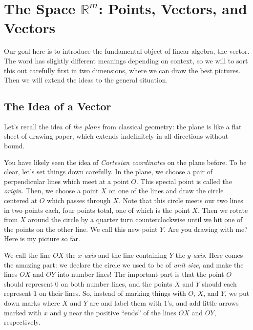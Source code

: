 \documentclass[elementsmain.tex]{subfiles}
\begin{document}
\section{The Space $\mathbb{R}^m$: Points, Vectors, and Vectors}


Our goal here is to introduce the fundamental object of linear algebra, the vector. The word has slightly different meanings depending on context, so we will to sort this out carefully first in two dimensions, where we can draw the best pictures. Then we will extend the ideas to the general situation.

\subsection*{The Idea of a Vector}

Let's recall the idea of \emph{the plane} from classical geometry: the plane is like a flat sheet of drawing paper, which extends indefinitely in all directions without bound.


You have likely seen the idea of \emph{Cartesian coordinates} on the plane before. To be clear, let's set things down carefully. In the plane, we choose a pair of perpendicular lines which meet at a point $O$. This special point is called the \emph{origin}. Then, we choose a point $X$ on one of the lines and draw the circle centered at $O$ which passes through $X$. Note that this circle meets our two lines in two points each, four points total, one of which is the point $X$. Then we rotate from $X$ around the circle by a quarter turn counterclockwise until we hit one of the points on the other line. We call this new point $Y$. Are you drawing with me? Here is my picture so far.

\begin{figure}[h!]
\centering
{}
\end{figure}

We call the line $OX$ the \emph{$x$-axis} and the line containing $Y$ the \emph{$y$-axis}. Here comes the amazing part: we declare the circle we used to be of \emph{unit size}, and make the lines $OX$ and $OY$ into number lines! The important part is that the point $O$ should represent $0$ on both number lines, and the points $X$ and $Y$ should each represent $1$ on their lines. So, instead of marking things with $O$, $X$, and $Y$, we put down marks where $X$ and $Y$ are and label them with $1$'s, and add little arrows marked with $x$ and $y$ near the positive ``ends'' of the lines $OX$ and $OY$, respectively.
\end{document}

